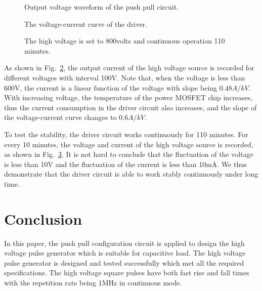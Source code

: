 \documentclass[aip,rsi,reprint,graphicx]{revtex4-1} %
\begin{document}
\begin{figure}
\caption{Output voltage waveform of the push pull circuit.\label{Fig4}}%
\end{figure}

\begin{figure}
\caption{The voltage-current curve of the driver.\label{FIG5}}%
\end{figure}

\begin{figure}
\caption{The high voltage is set to 800volts and continuous operation 110 minutes.\label{Fig6}}%
\end{figure}
As shown in Fig.~\ref{FIG5}, the output current of the high voltage source is recorded for different voltages with interval 100V. Note that, when the voltage is less than 600V, the current is a linear function of the voltage with slope being $0.48A/kV$. With increasing voltage, the temperature of the power MOSFET chip increases, thus the current consumption in the driver circuit also increases, and the slope of the voltage-current curve changes to $0.6A/kV$.

To test the stability, the driver circuit works continuously for 110 minutes. For every 10 minutes, the voltage and current of the high voltage source is recorded, as shown in Fig.~\ref{Fig6}. It is not hard to conclude that the fluctuation of the voltage is less than 10V and the fluctuation of the current is less than 10mA. We thus demonstrate that the driver circuit is able to work stably continuously under long time.


\section{Conclusion}
In this paper, the push pull configuration circuit is applied to design the high voltage pulse generator which is suitable for capacitive load. The high voltage pulse generator is designed and tested successfully which met all the required specifications. The high voltage square pulses have both fast rise and fall times with the repetition rate being 1MHz in continuous mode.
\end{document}
